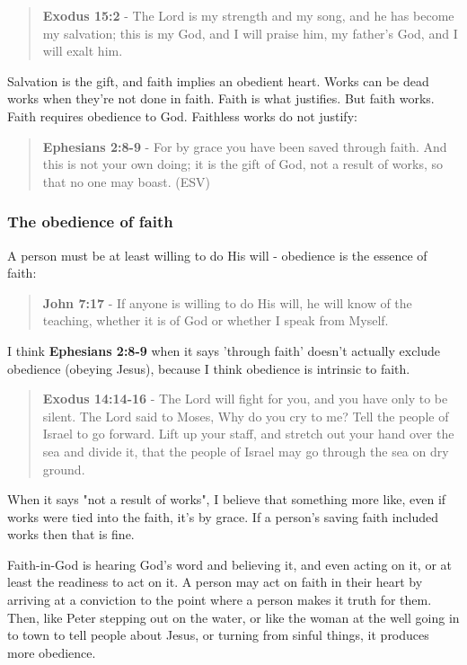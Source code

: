 \documentclass[11pt]{article}
\begin{document}
\begin{quote}
\textbf{Exodus 15:2} - The Lord is my strength and my song, and he has become my salvation; this is my God, and I will praise him, my father's God, and I will exalt him.
\end{quote}

Salvation is the gift, and faith implies an obedient heart. Works can be dead works when they're not done in faith. Faith is what justifies. But faith works. Faith requires obedience to God. Faithless works do not justify:

\begin{quote}
\textbf{Ephesians 2:8-9} - For by grace you have been saved through faith. And this is not your own doing; it is the gift of God, not a result of works, so that no one may boast. (ESV)
\end{quote}

\subsubsection{The obedience of faith}
\label{sec:orgf174480}

A person must be at least willing to do His will - obedience is the essence of faith:

\begin{quote}
\textbf{John 7:17} - If anyone is willing to do His will, he will know of the teaching, whether it is of God or whether I speak from Myself.
\end{quote}

I think \textbf{Ephesians 2:8-9} when it says 'through faith' doesn't actually exclude obedience (obeying Jesus), because I think obedience is intrinsic to faith.

\begin{quote}
\textbf{Exodus 14:14-16} - The Lord will fight for you, and you have only to be silent.  The Lord said to Moses, Why do you cry to me? Tell the people of Israel to go forward.  Lift up your staff, and stretch out your hand over the sea and divide it, that the people of Israel may go through the sea on dry ground.
\end{quote}

When it says "not a result of works", I believe that something more like, even if works were tied into the faith, it's by grace. If a person's saving faith included works then that is fine.

Faith-in-God is hearing God's word and believing it, and even acting on it, or at least the readiness to act on it.
A person may act on faith in their heart by arriving at a conviction to the point where a person makes it truth for them.
Then, like Peter stepping out on the water, or like the woman at the well going in to town to tell people about Jesus, or turning from sinful things, it produces more obedience.
\end{document}
